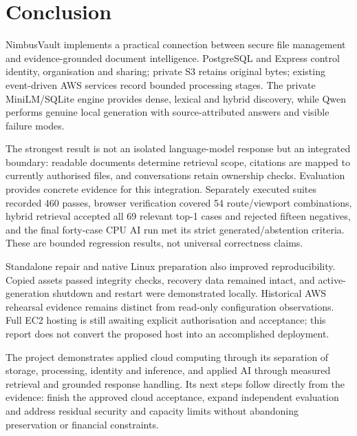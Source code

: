 \chapter{Conclusion}
NimbusVault implements a practical connection between secure file management and evidence-grounded document intelligence. PostgreSQL and Express control identity, organisation and sharing; private S3 retains original bytes; existing event-driven AWS services record bounded processing stages. The private MiniLM/SQLite engine provides dense, lexical and hybrid discovery, while Qwen performs genuine local generation with source-attributed answers and visible failure modes.

The strongest result is not an isolated language-model response but an integrated boundary: readable documents determine retrieval scope, citations are mapped to currently authorised files, and conversations retain ownership checks. Evaluation provides concrete evidence for this integration. Separately executed suites recorded 460 passes, browser verification covered 54 route/viewport combinations, hybrid retrieval accepted all 69 relevant top-1 cases and rejected fifteen negatives, and the final forty-case CPU AI run met its strict generated/abstention criteria. These are bounded regression results, not universal correctness claims.

Standalone repair and native Linux preparation also improved reproducibility. Copied assets passed integrity checks, recovery data remained intact, and active-generation shutdown and restart were demonstrated locally. Historical AWS rehearsal evidence remains distinct from read-only configuration observations. Full EC2 hosting is still awaiting explicit authorisation and acceptance; this report does not convert the proposed host into an accomplished deployment.

The project demonstrates applied cloud computing through its separation of storage, processing, identity and inference, and applied AI through measured retrieval and grounded response handling. Its next steps follow directly from the evidence: finish the approved cloud acceptance, expand independent evaluation and address residual security and capacity limits without abandoning preservation or financial constraints.
\FloatBarrier
